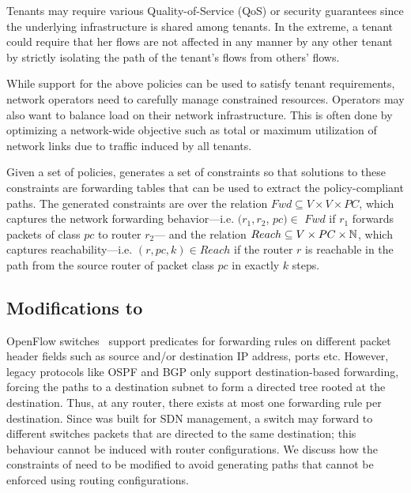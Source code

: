    Tenants may require various
  Quality-of-Service (QoS) or security guarantees since the 
  underlying infrastructure is shared among tenants. In the extreme, a
  tenant could require that her flows are not affected in any manner
  by any other tenant by strictly isolating the path of the tenant's
  flows from others' flows. 

   While support for the above policies can be used to satisfy tenant 
  requirements, network operators need to 
  carefully manage constrained resources. Operators may also want
  to balance load on their network infrastructure. This is often done
  by optimizing a network-wide objective such as total or maximum
  utilization of network links due to traffic induced by all tenants. 

Given a set of policies, \genesis generates a set of constraints 
so that solutions to these constraints are forwarding
tables that can be used to extract the 
policy-compliant paths.
The generated constraints are over the relation $Fwd \subseteq V \times V \times PC$,
which captures
the network forwarding behavior---i.e. 
$(r_1, r_2$, $pc)\in$ $Fwd$ if 
$r_1$ forwards packets of class $pc$ to router $r_2$---
and 
the relation $Reach \subseteq V \times PC \times \mathbb{N}$,
which captures
reachability---i.e. $(r, pc, k)\in Reach$ if 
the router $r$ is reachable in the path from the source
router of packet class $pc$ in exactly $k$ steps.

\subsection{Modifications to \genesis}
OpenFlow switches~\cite{openflow} support predicates for
forwarding rules on different packet header fields such as source
and/or destination IP address, ports etc. However, legacy protocols
like OSPF and BGP only support destination-based forwarding, 
forcing the paths to a destination subnet to 
form a directed tree rooted at the destination. 
Thus,
at any router, there exists at most one forwarding rule per destination. 
Since \genesis was built for
SDN management,  a switch may forward to different switches
packets that are directed to the same destination;
this behaviour cannot be induced with router
configurations. We  discuss how the
constraints of \genesis
need to be modified to avoid generating paths that 
cannot be enforced using routing configurations.

